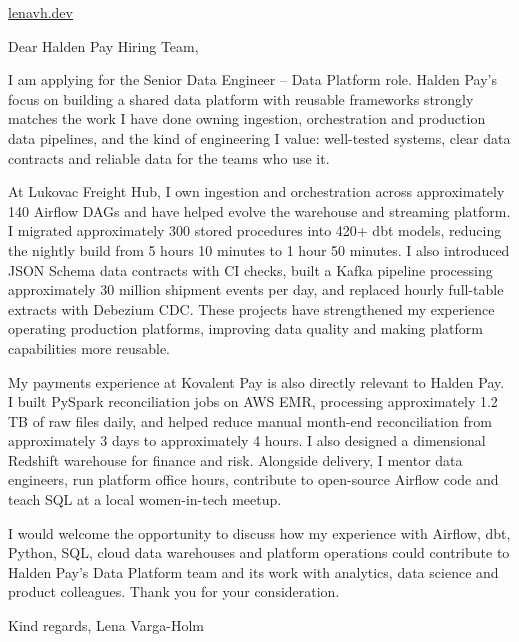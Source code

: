 \documentclass[11pt,a4paper]{article}
\begin{document}
\url{lenavh.dev}

Dear Halden Pay Hiring Team,

I am applying for the Senior Data Engineer -- Data Platform role. Halden Pay’s focus on building a shared data platform with reusable frameworks strongly matches the work I have done owning ingestion, orchestration and production data pipelines, and the kind of engineering I value: well-tested systems, clear data contracts and reliable data for the teams who use it.

At Lukovac Freight Hub, I own ingestion and orchestration across approximately 140 Airflow DAGs and have helped evolve the warehouse and streaming platform. I migrated approximately 300 stored procedures into 420+ dbt models, reducing the nightly build from 5 hours 10 minutes to 1 hour 50 minutes. I also introduced JSON Schema data contracts with CI checks, built a Kafka pipeline processing approximately 30 million shipment events per day, and replaced hourly full-table extracts with Debezium CDC. These projects have strengthened my experience operating production platforms, improving data quality and making platform capabilities more reusable.

My payments experience at Kovalent Pay is also directly relevant to Halden Pay. I built PySpark reconciliation jobs on AWS EMR, processing approximately 1.2 TB of raw files daily, and helped reduce manual month-end reconciliation from approximately 3 days to approximately 4 hours. I also designed a dimensional Redshift warehouse for finance and risk. Alongside delivery, I mentor data engineers, run platform office hours, contribute to open-source Airflow code and teach SQL at a local women-in-tech meetup.

I would welcome the opportunity to discuss how my experience with Airflow, dbt, Python, SQL, cloud data warehouses and platform operations could contribute to Halden Pay’s Data Platform team and its work with analytics, data science and product colleagues. Thank you for your consideration.

Kind regards,
Lena Varga-Holm
\end{document}
